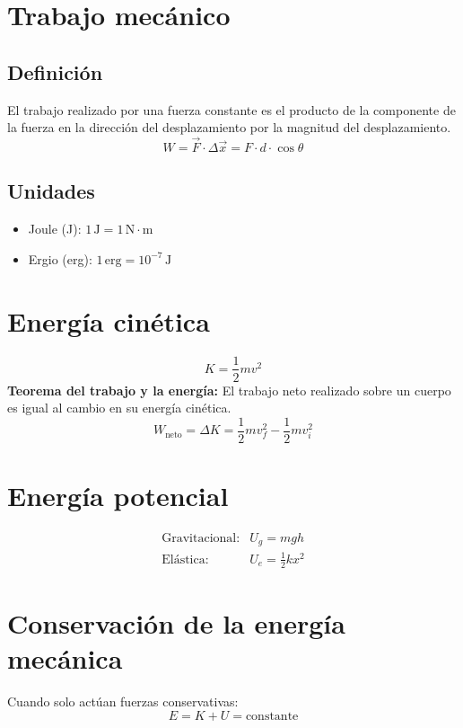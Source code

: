 \section{Trabajo mecánico}

\subsection{Definición}
El trabajo realizado por una fuerza constante es el producto de la componente de la fuerza en la dirección del desplazamiento por la magnitud del desplazamiento.
\begin{equation}
    W = \vec{F} \cdot \Delta \vec{x} = F \cdot d \cdot \cos \theta
\end{equation}

\subsection{Unidades}
\begin{itemize}
    \item Joule (J): \(1 \, \text{J} = 1 \, \text{N} \cdot \text{m}\)
    \item Ergio (erg): \(1 \, \text{erg} = 10^{-7} \, \text{J}\)
\end{itemize}

\section{Energía cinética}
\begin{equation}
    K = \frac{1}{2} m v^2
\end{equation}
\textbf{Teorema del trabajo y la energía:} El trabajo neto realizado sobre un cuerpo es igual al cambio en su energía cinética.
\begin{equation}
    W_{\text{neto}} = \Delta K = \frac{1}{2} m v_f^2 - \frac{1}{2} m v_i^2
\end{equation}

\section{Energía potencial}
\begin{align}
    \text{Gravitacional:} & U_g = m g h \\
    \text{Elástica:} & U_e = \frac{1}{2} k x^2
\end{align}

\section{Conservación de la energía mecánica}
Cuando solo actúan fuerzas conservativas:
\begin{equation}
    E = K + U = \text{constante}
\end{equation}

